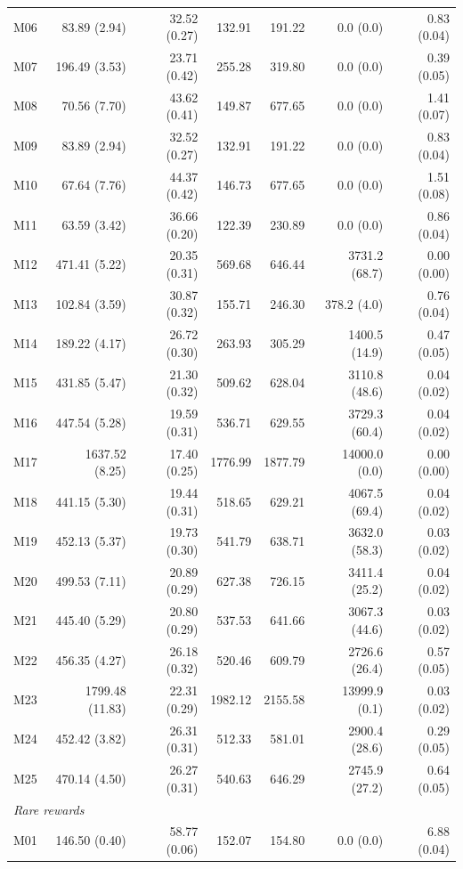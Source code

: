 \documentclass[11pt]{article}
\theoremstyle{remark}
\begin{document}
\begin{longtable}{lrrrrrr}
M06 & 83.89 (2.94) & 32.52 (0.27) & 132.91 & 191.22 & 0.0 (0.0) & 0.83 (0.04) \\
M07 & 196.49 (3.53) & 23.71 (0.42) & 255.28 & 319.80 & 0.0 (0.0) & 0.39 (0.05) \\
M08 & 70.56 (7.70) & 43.62 (0.41) & 149.87 & 677.65 & 0.0 (0.0) & 1.41 (0.07) \\
M09 & 83.89 (2.94) & 32.52 (0.27) & 132.91 & 191.22 & 0.0 (0.0) & 0.83 (0.04) \\
M10 & 67.64 (7.76) & 44.37 (0.42) & 146.73 & 677.65 & 0.0 (0.0) & 1.51 (0.08) \\
M11 & 63.59 (3.42) & 36.66 (0.20) & 122.39 & 230.89 & 0.0 (0.0) & 0.86 (0.04) \\
M12 & 471.41 (5.22) & 20.35 (0.31) & 569.68 & 646.44 & 3731.2 (68.7) & 0.00 (0.00) \\
M13 & 102.84 (3.59) & 30.87 (0.32) & 155.71 & 246.30 & 378.2 (4.0) & 0.76 (0.04) \\
M14 & 189.22 (4.17) & 26.72 (0.30) & 263.93 & 305.29 & 1400.5 (14.9) & 0.47 (0.05) \\
M15 & 431.85 (5.47) & 21.30 (0.32) & 509.62 & 628.04 & 3110.8 (48.6) & 0.04 (0.02) \\
M16 & 447.54 (5.28) & 19.59 (0.31) & 536.71 & 629.55 & 3729.3 (60.4) & 0.04 (0.02) \\
M17 & 1637.52 (8.25) & 17.40 (0.25) & 1776.99 & 1877.79 & 14000.0 (0.0) & 0.00 (0.00) \\
M18 & 441.15 (5.30) & 19.44 (0.31) & 518.65 & 629.21 & 4067.5 (69.4) & 0.04 (0.02) \\
M19 & 452.13 (5.37) & 19.73 (0.30) & 541.79 & 638.71 & 3632.0 (58.3) & 0.03 (0.02) \\
M20 & 499.53 (7.11) & 20.89 (0.29) & 627.38 & 726.15 & 3411.4 (25.2) & 0.04 (0.02) \\
M21 & 445.40 (5.29) & 20.80 (0.29) & 537.53 & 641.66 & 3067.3 (44.6) & 0.03 (0.02) \\
M22 & 456.35 (4.27) & 26.18 (0.32) & 520.46 & 609.79 & 2726.6 (26.4) & 0.57 (0.05) \\
M23 & 1799.48 (11.83) & 22.31 (0.29) & 1982.12 & 2155.58 & 13999.9 (0.1) & 0.03 (0.02) \\
M24 & 452.42 (3.82) & 26.31 (0.31) & 512.33 & 581.01 & 2900.4 (28.6) & 0.29 (0.05) \\
M25 & 470.14 (4.50) & 26.27 (0.31) & 540.63 & 646.29 & 2745.9 (27.2) & 0.64 (0.05) \\
\multicolumn{7}{l}{\textit{Rare rewards}} \\
M01 & 146.50 (0.40) & 58.77 (0.06) & 152.07 & 154.80 & 0.0 (0.0) & 6.88 (0.04) \\

\end{longtable}
\end{document}
